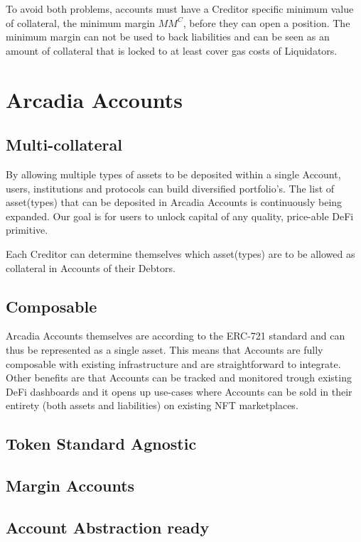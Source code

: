 \documentclass[sigconf,nonacm]{acmart}
\begin{document}
To avoid both problems, accounts must have a Creditor specific minimum value of collateral, the minimum margin $MM^{C}$, before they can open a position.
The minimum margin can not be used to back liabilities and can be seen as an amount of collateral that is locked to at least cover gas costs of Liquidators.

\section{Arcadia Accounts}
\label{sec:arcadia-accounts}

\subsection{Multi-collateral}
By allowing multiple types of assets to be deposited within a single Account, users, institutions and protocols can build diversified portfolio's.
The list of asset(types) that can be deposited in Arcadia Accounts is continuously being expanded. Our goal is for users to unlock capital of any quality, price-able DeFi primitive.

Each Creditor can determine themselves which asset(types) are to be allowed as collateral in Accounts of their Debtors.

\subsection{Composable}
Arcadia Accounts themselves are according to the ERC-721 standard and can thus be represented as a single asset.
This means that Accounts are fully composable with existing infrastructure and are straightforward to integrate.
Other benefits are that Accounts can be tracked and monitored trough existing DeFi dashboards and it opens up use-cases where Accounts can be sold in their entirety (both assets and liabilities) on existing NFT marketplaces.

\subsection{Token Standard Agnostic}

\subsection{Margin Accounts}
\label{subsec:margin-accounts}

\subsection{Account Abstraction ready}
\end{document}
